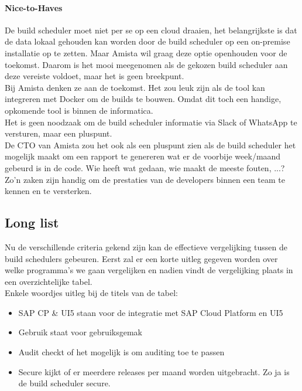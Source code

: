             
            \paragraph{Nice-to-Haves}
            De build scheduler moet niet per se op een cloud draaien, het belangrijkste is dat de data lokaal gehouden kan worden door de build scheduler op een on-premise installatie op te zetten. Maar Amista wil graag deze optie openhouden voor de toekomst. Daarom is het mooi meegenomen als de gekozen build scheduler aan deze vereiste voldoet, maar het is geen breekpunt.\\
            Bij Amista denken ze aan de toekomst. Het zou leuk zijn als de tool kan integreren met Docker om de builds te bouwen. Omdat dit toch een handige, opkomende tool is binnen de informatica.\\
            Het is geen noodzaak om de build scheduler informatie via Slack of WhatsApp te versturen, maar een pluspunt.\\
            De CTO van Amista zou het ook als een pluspunt zien als de build scheduler het mogelijk maakt om een rapport te genereren wat er de voorbije week/maand gebeurd is in de code. Wie heeft wat gedaan, wie maakt de meeste fouten, ...? Zo'n zaken zijn handig om de prestaties van de developers binnen een team te kennen en te versterken.

        \subsection{Long list}
        Nu de verschillende criteria gekend zijn kan de effectieve vergelijking tussen de build schedulers gebeuren.
        Eerst zal er een korte uitleg gegeven worden over welke programma's we gaan vergelijken en nadien vindt de vergelijking plaats in een overzichtelijke tabel.\\
        Enkele woordjes uitleg bij de titels van de tabel: 
        \begin{itemize}
            \item SAP CP \& UI5 staan voor de integratie met SAP Cloud Platform en UI5
            \item Gebruik staat voor gebruiksgemak
            \item Audit checkt of het mogelijk is om auditing toe te passen
            \item Secure kijkt of er meerdere releases per maand worden uitgebracht. Zo ja is de build scheduler secure.
        \end{itemize}

